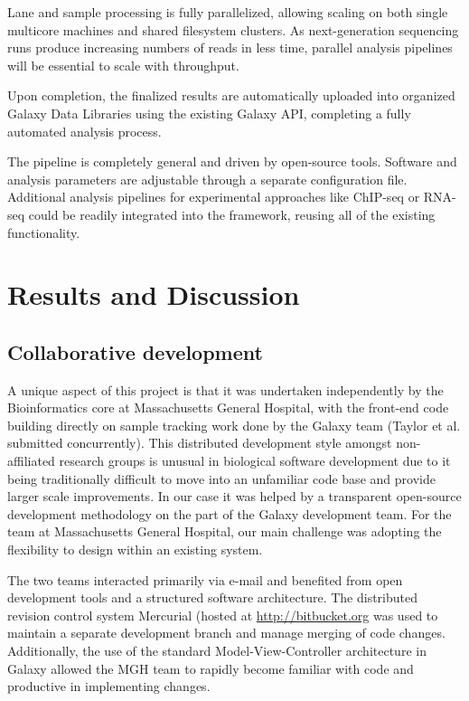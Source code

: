 \documentclass[10pt]{bmc_article}
\newenvironment{bmcformat}{\begin{raggedright}\baselineskip20pt\sloppy\setboolean{publ}{false}}{\end{raggedright}\baselineskip20pt\sloppy}
\begin{document}
\begin{bmcformat}
Lane and sample processing is fully parallelized, allowing scaling on
both single multicore machines and shared filesystem clusters. As
next-generation sequencing runs produce increasing numbers of reads in
less time, parallel analysis pipelines will be essential to scale with
throughput.

Upon completion, the finalized results are
automatically uploaded into organized Galaxy Data Libraries using the
existing Galaxy API, completing a fully automated analysis process.

The pipeline is completely general and driven by open-source
tools. Software and analysis parameters are adjustable through a
separate configuration file. Additional analysis pipelines for
experimental approaches like ChIP-seq or RNA-seq could be readily
integrated into the framework, reusing all of the existing
functionality.

\section*{Results and Discussion}

\subsection*{Collaborative development}

A unique aspect of this project is that it was undertaken
independently by the Bioinformatics core at Massachusetts General
Hospital, with the front-end code building directly on sample tracking
work done by the Galaxy team (Taylor et al. submitted concurrently).
This distributed development style
amongst non-affiliated research groups is unusual in biological software
development due to it being traditionally difficult to move into an
unfamiliar code base and provide larger scale improvements. In our
case it was helped by a transparent open-source development
methodology on the part of the Galaxy development team. For the team
at Massachusetts General Hospital, our main challenge was adopting
the flexibility to design within an existing system.

The two teams interacted primarily via e-mail and benefited from open
development tools and a structured software architecture. The
distributed revision control system Mercurial (hosted at
\url{http://bitbucket.org} was used to maintain a separate development
branch and manage merging of code changes. Additionally, the use of
the standard Model-View-Controller architecture in Galaxy allowed the
MGH team to rapidly become familiar with code and productive in
implementing changes.


\end{bmcformat}
\end{document}
